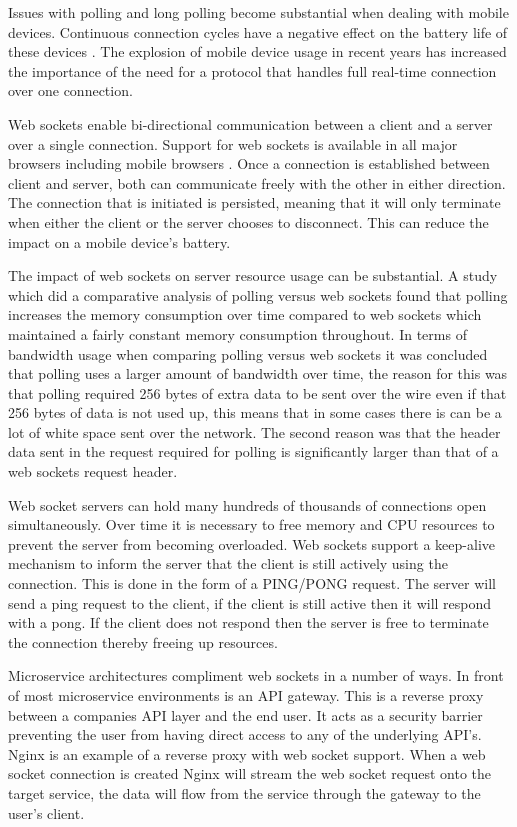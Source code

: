 Issues with polling and long polling become substantial when dealing with mobile devices. Continuous connection cycles have a negative effect on the battery life of these devices \cite{6364271}. The explosion of mobile device usage in recent years \cite{6365155} has increased the importance of the need for a protocol that handles full real-time connection over one connection.

Web sockets enable bi-directional communication between a client and a server over a single connection. Support for web sockets is available in all major browsers including mobile browsers \cite{websocket-browser-support}. Once a connection is established between client and server, both can communicate freely with the other in either direction. The connection that is initiated is persisted, meaning that it will only terminate when either the client or the server chooses to disconnect. This can reduce the impact on a mobile device's battery.

The impact of web sockets on server resource usage can be substantial. A study which did a comparative analysis of polling versus web sockets found that polling increases the memory consumption over time compared to web sockets which maintained a fairly constant memory consumption throughout\cite{6601579}. In terms of bandwidth usage when comparing polling versus web sockets it was concluded that polling uses a larger amount of bandwidth over time, the reason for this was that polling required 256 bytes of extra data to be sent over the wire even if that 256 bytes of data is not used up, this means that in some cases there is can be a lot of white space sent over the network. The second reason was that the header data sent in the request required for polling is significantly larger than that of a web sockets request header\cite{6601579}.

Web socket servers can hold many hundreds of thousands of connections open simultaneously. Over time it is necessary to free memory and CPU resources to prevent the server from becoming overloaded. Web sockets support a keep-alive mechanism to inform the server that the client is still actively using the connection. This is done in the form of a PING/PONG request. The server will send a ping request to the client, if the client is still active then it will respond with a pong. If the client does not respond then the server is free to terminate the connection thereby freeing up resources. 

Microservice architectures compliment web sockets in a number of ways. In front of most microservice environments is an API gateway\cite{6885428}. This is a reverse proxy between a companies API layer and the end user. It acts as a security barrier preventing the user from having direct access to any of the underlying API's. Nginx is an example of a reverse proxy with web socket support. When a web socket connection is created Nginx will stream the web socket request onto the target service, the data will flow from the service through the gateway to the user's client.


